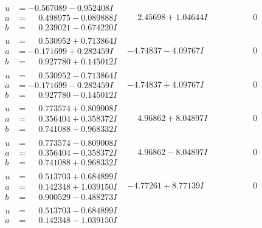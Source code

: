 \documentclass[1p]{elsarticle_modified}
\theoremstyle{definition}
\begin{document}
$$\begin{array}{c|c|c}
\begin{aligned}
u &= -0.567089 - 0.952408 I \\
a &= \phantom{-}0.498975 - 0.089888 I \\
b &= \phantom{-}0.239021 - 0.674220 I\end{aligned}
 & \phantom{-}2.45698 + 1.04644 I & \phantom{-0.000000 } 0 \\ \hline\begin{aligned}
u &= \phantom{-}0.530952 + 0.713864 I \\
a &= -0.171699 + 0.282459 I \\
b &= \phantom{-}0.927780 + 0.145012 I\end{aligned}
 & -4.74837 - 4.09767 I & \phantom{-0.000000 } 0 \\ \hline\begin{aligned}
u &= \phantom{-}0.530952 - 0.713864 I \\
a &= -0.171699 - 0.282459 I \\
b &= \phantom{-}0.927780 - 0.145012 I\end{aligned}
 & -4.74837 + 4.09767 I & \phantom{-0.000000 } 0 \\ \hline\begin{aligned}
u &= \phantom{-}0.773574 + 0.809008 I \\
a &= \phantom{-}0.356404 + 0.358372 I \\
b &= \phantom{-}0.741088 - 0.968332 I\end{aligned}
 & \phantom{-}4.96862 + 8.04897 I & \phantom{-0.000000 } 0 \\ \hline\begin{aligned}
u &= \phantom{-}0.773574 - 0.809008 I \\
a &= \phantom{-}0.356404 - 0.358372 I \\
b &= \phantom{-}0.741088 + 0.968332 I\end{aligned}
 & \phantom{-}4.96862 - 8.04897 I & \phantom{-0.000000 } 0 \\ \hline\begin{aligned}
u &= \phantom{-}0.513703 + 0.684899 I \\
a &= \phantom{-}0.142348 + 1.039150 I \\
b &= \phantom{-}0.900529 - 0.488273 I\end{aligned}
 & -4.77261 + 8.77139 I & \phantom{-0.000000 } 0 \\ \hline\begin{aligned}
u &= \phantom{-}0.513703 - 0.684899 I \\
a &= \phantom{-}0.142348 - 1.039150 I \\

\end{aligned}
\end{array}$$
\end{document}
